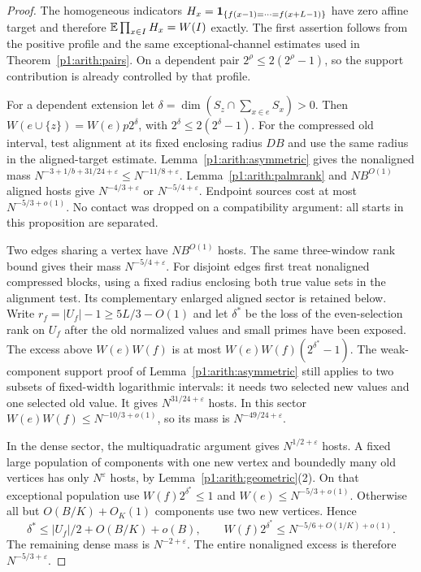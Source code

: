 \begin{proof}
The homogeneous indicators
$H_x=\mathbf 1_{\{f(x-1)=\cdots=f(x+L-1)\}}$ have zero affine target and
therefore $\mathbb E\prod_{x\in I}H_x=W(I)$ exactly.
The first assertion follows from the positive profile and the same
exceptional-channel estimates used in Theorem~\ref{p1:arith:pairs}.
On a dependent pair $2^\rho\leq2(2^\rho-1)$, so the support contribution
is already controlled by that profile.

For a dependent extension let $\delta=\dim(S_z\cap\sum_{x\in e}S_x)>0$.
Then $W(e\cup\{z\})=W(e)p2^\delta$, with
$2^\delta\leq2(2^\delta-1)$.
For the compressed old interval, test alignment at its fixed enclosing
radius $DB$ and use the same radius in the aligned-target estimate.
Lemma~\ref{p1:arith:asymmetric} gives
the nonaligned mass
$N^{-3+1/b+31/24+\varepsilon}\leq N^{-11/8+\varepsilon}$.
Lemma~\ref{p1:arith:palmrank} and $NB^{O(1)}$ aligned hosts give
$N^{-4/3+\varepsilon}$ or $N^{-5/4+\varepsilon}$.
Endpoint sources cost at most $N^{-5/3+o(1)}$.  No contact was dropped
on a compatibility argument: all starts in this proposition are separated.

Two edges sharing a vertex have $NB^{O(1)}$ hosts.  The same three-window
rank bound gives their mass $N^{-5/4+\varepsilon}$.
For disjoint edges first treat nonaligned compressed blocks, using
a fixed radius enclosing both true value sets in the alignment test.
Its complementary enlarged aligned sector is retained below.  Write
$r_f=|U_f|-1\geq5L/3-O(1)$ and let $\delta^*$ be the loss of the
even-selection rank on $U_f$ after the old normalized values and small
primes have been exposed.  The excess above $W(e)W(f)$ is at most
$W(e)W(f)(2^{\delta^*}-1)$.
The weak-component support proof of Lemma~\ref{p1:arith:asymmetric}
still applies to two subsets of fixed-width logarithmic intervals:
it needs two selected new values and one selected old value.
It gives $N^{31/24+\varepsilon}$ hosts.  In this sector
$W(e)W(f)\leq N^{-10/3+o(1)}$, so its mass is
$N^{-49/24+\varepsilon}$.

In the dense sector, the multiquadratic argument gives
$N^{1/2+\varepsilon}$ hosts.  A fixed large population of components
with one new vertex and boundedly many old vertices has only
$N^\varepsilon$ hosts, by Lemma~\ref{p1:arith:geometric}(2).
On that exceptional population use $W(f)2^{\delta^*}\leq1$ and
$W(e)\leq N^{-5/3+o(1)}$.  Otherwise all but
$O(B/K)+O_K(1)$ components use two new vertices.  Hence
\[
 \delta^*\leq|U_f|/2+O(B/K)+o(B),\qquad
 W(f)2^{\delta^*}\leq N^{-5/6+O(1/K)+o(1)}.
\]
The remaining dense mass is $N^{-2+\varepsilon}$.
The entire nonaligned excess is therefore $N^{-5/3+\varepsilon}$.


\end{proof}
